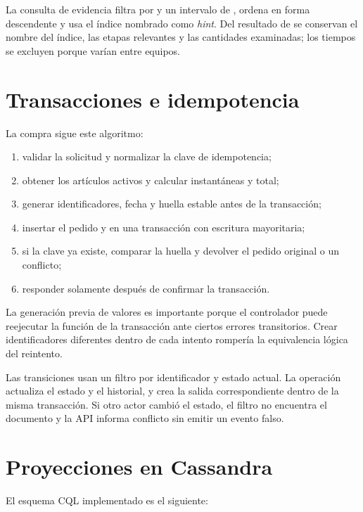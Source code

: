 La consulta de evidencia filtra por  y un intervalo de , ordena en forma descendente y usa el índice nombrado como \emph{hint}. Del resultado de  se conservan el nombre del índice, las etapas relevantes y las cantidades examinadas; los tiempos se excluyen porque varían entre equipos.

\section{Transacciones e idempotencia}

La compra sigue este algoritmo:

\begin{enumerate}
  \item validar la solicitud y normalizar la clave de idempotencia;
  \item obtener los artículos activos y calcular instantáneas y total;
  \item generar identificadores, fecha y huella estable antes de la transacción;
  \item insertar el pedido y  en una transacción con escritura mayoritaria;
  \item si la clave ya existe, comparar la huella y devolver el pedido original o un conflicto;
  \item responder solamente después de confirmar la transacción.
\end{enumerate}

La generación previa de valores es importante porque el controlador puede reejecutar la función de la transacción ante ciertos errores transitorios. Crear identificadores diferentes dentro de cada intento rompería la equivalencia lógica del reintento.

Las transiciones usan un filtro por identificador y estado actual. La operación actualiza el estado y el historial, y crea la salida correspondiente dentro de la misma transacción. Si otro actor cambió el estado, el filtro no encuentra el documento y la API informa conflicto sin emitir un evento falso.

\section{Proyecciones en Cassandra}

El esquema CQL implementado es el siguiente:

